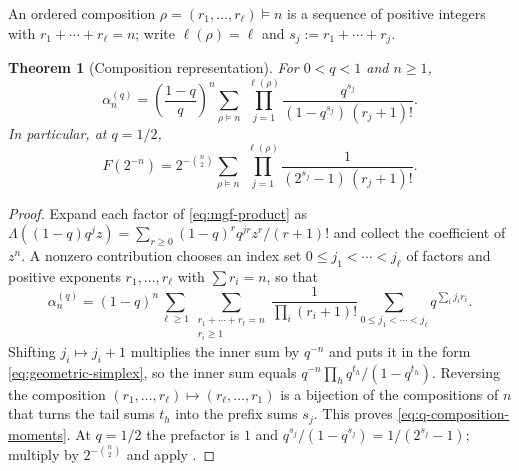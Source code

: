 \documentclass[11pt,a4paper,oneside,openany]{book}
\newtheorem{theorem}{Theorem}[chapter]
\theoremstyle{definition}
\theoremstyle{remark}
\begin{document}
An ordered composition $\rho=(r_1,\ldots,r_\ell)\vDash n$ is a sequence of positive
integers with $r_1+\cdots+r_\ell=n$; write $\ell(\rho)=\ell$ and
$s_j:=r_1+\cdots+r_j$.

\begin{theorem}[Composition representation]\label{thm:fabius-composition}
For $0<q<1$ and $n\ge1$,
\begin{equation}\label{eq:q-composition-moments}
 \alpha_n^{(q)}
 =\left(\frac{1-q}{q}\right)^{\!n}
  \sum_{\rho\vDash n}\ \prod_{j=1}^{\ell(\rho)}
  \frac{q^{s_j}}{(1-q^{s_j})\,(r_j+1)!}.
\end{equation}
In particular, at $q=1/2$,
\begin{equation}\label{eq:fabius-composition}
 F(2^{-n})
 =2^{-\binom n2}\sum_{\rho\vDash n}\
 \prod_{j=1}^{\ell(\rho)}\frac1{(2^{s_j}-1)\,(r_j+1)!}.
\end{equation}
\end{theorem}

\begin{proof}
Expand each factor of \eqref{eq:mgf-product} as
$\Lambda((1-q)q^jz)=\sum_{r\ge0}(1-q)^rq^{jr}z^r/(r+1)!$ and collect the coefficient of
$z^n$.  A nonzero contribution chooses an index set $0\le j_1<\cdots<j_\ell$ of factors
and positive exponents $r_1,\ldots,r_\ell$ with $\sum r_i=n$, so that
\[
 \alpha_n^{(q)}
 =(1-q)^n\sum_{\ell\ge1}
  \sum_{\substack{r_1+\cdots+r_\ell=n\\ r_i\ge1}}
  \frac1{\prod_i(r_i+1)!}
  \sum_{0\le j_1<\cdots<j_\ell}q^{\sum_ij_ir_i}.
\]
Shifting $j_i\mapsto j_i+1$ multiplies the inner sum by $q^{-n}$ and puts it in the form
\eqref{eq:geometric-simplex}, so the inner sum equals
$q^{-n}\prod_hq^{t_h}/(1-q^{t_h})$.  Reversing the composition
$(r_1,\ldots,r_\ell)\mapsto(r_\ell,\ldots,r_1)$ is a bijection of the compositions of
$n$ that turns the tail sums $t_h$ into the prefix sums $s_j$.  This proves
\eqref{eq:q-composition-moments}.  At $q=1/2$ the prefactor is $1$ and
$q^{s_j}/(1-q^{s_j})=1/(2^{s_j}-1)$; multiply by $2^{-\binom n2}$ and apply
\Cref{thm:fabius-half-moment}.
\end{proof}
\end{document}
